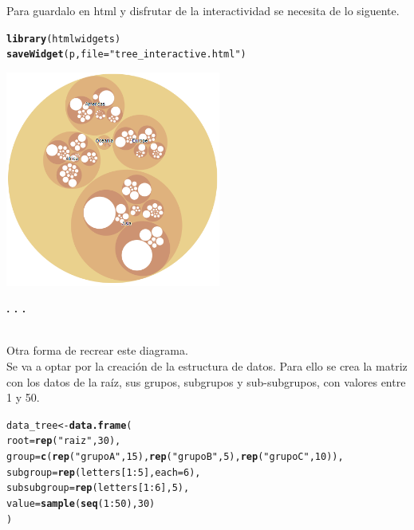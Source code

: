\documentclass{article}\usepackage[]{graphicx}\usepackage[]{color}
\makeatletter
\newcommand{\hlnum}[1]{\textcolor[rgb]{0.686,0.059,0.569}{#1}}%
\newcommand{\hlstr}[1]{\textcolor[rgb]{0.192,0.494,0.8}{#1}}%
\newcommand{\hlopt}[1]{\textcolor[rgb]{0,0,0}{#1}}%
\newcommand{\hlstd}[1]{\textcolor[rgb]{0.345,0.345,0.345}{#1}}%
\newcommand{\hlkwb}[1]{\textcolor[rgb]{0.69,0.353,0.396}{#1}}%
\newcommand{\hlkwc}[1]{\textcolor[rgb]{0.333,0.667,0.333}{#1}}%
\newcommand{\hlkwd}[1]{\textcolor[rgb]{0.737,0.353,0.396}{\textbf{#1}}}%
\newenvironment{kframe}{%
 \def\at@end@of@kframe{}%
 \ifinner\ifhmode%
  \def\at@end@of@kframe{\end{minipage}}%
  \begin{minipage}{\columnwidth}%
 \fi\fi%
 \def\FrameCommand##1{\hskip\@totalleftmargin \hskip-\fboxsep
 \colorbox{shadecolor}{##1}\hskip-\fboxsep
     \hskip-\linewidth \hskip-\@totalleftmargin \hskip\columnwidth}%
 \MakeFramed {\advance\hsize-\width
   \@totalleftmargin\z@ \linewidth\hsize
   \@setminipage}}%
 {\par\unskip\endMakeFramed%
 \at@end@of@kframe}
\newenvironment{knitrout}{}{} %
\makeatother
\begin{document}
Para guardalo en html y disfrutar de la interactividad se necesita de lo siguente.
\begin{knitrout}
\color{fgcolor}\begin{kframe}
\begin{alltt}
\hlkwd{library}\hlstd{(htmlwidgets)}
\hlkwd{saveWidget}\hlstd{(p,} \hlkwc{file}\hlstd{=}\hlstr{"tree_interactive.html"}\hlstd{)}
\end{alltt}
\end{kframe}
\end{knitrout}
\vbox{
    \centering
    \includegraphics[width=0.53\textwidth]{imag/tree_interactive}
}
\begin{center}
\textbf{. . .}
\end{center}
~\\
Otra forma de recrear este diagrama.~\\ Se va a optar por la creaci\'on de la estructura de datos. Para ello se crea la matriz con los datos de la ra\'iz, sus grupos, subgrupos y sub-subgrupos, con valores entre 1 y 50.
\begin{knitrout}
\color{fgcolor}\begin{kframe}
\begin{alltt}
\hlstd{data_tree} \hlkwb{<-} \hlkwd{data.frame}\hlstd{(}
  \hlkwc{root}\hlstd{=}\hlkwd{rep}\hlstd{(}\hlstr{"raiz"}\hlstd{,} \hlnum{30}\hlstd{),}
  \hlkwc{group}\hlstd{=}\hlkwd{c}\hlstd{(}\hlkwd{rep}\hlstd{(}\hlstr{"grupo A"}\hlstd{,}\hlnum{15}\hlstd{),} \hlkwd{rep}\hlstd{(}\hlstr{"grupo B"}\hlstd{,}\hlnum{5}\hlstd{),} \hlkwd{rep}\hlstd{(}\hlstr{"grupo C"}\hlstd{,}\hlnum{10}\hlstd{)),}
  \hlkwc{subgroup}\hlstd{=} \hlkwd{rep}\hlstd{(letters[}\hlnum{1}\hlopt{:}\hlnum{5}\hlstd{],} \hlkwc{each}\hlstd{=}\hlnum{6}\hlstd{),}
  \hlkwc{subsubgroup}\hlstd{=}\hlkwd{rep}\hlstd{(letters[}\hlnum{1}\hlopt{:}\hlnum{6}\hlstd{],} \hlnum{5}\hlstd{),}
  \hlkwc{value}\hlstd{=}\hlkwd{sample}\hlstd{(}\hlkwd{seq}\hlstd{(}\hlnum{1}\hlopt{:}\hlnum{50}\hlstd{),} \hlnum{30}\hlstd{)}
\hlstd{)}
\end{alltt}
\end{kframe}
\end{knitrout}
\end{document}
